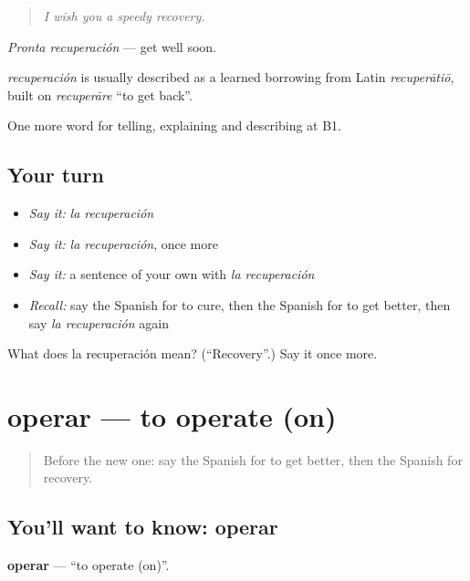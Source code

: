 \begin{quote}
\emph{I wish you a speedy recovery.}
\end{quote}

\emph{Pronta recuperación} — get well soon.

\begin{cousinweb}
\emph{recuperación} is usually described as a learned borrowing from Latin \emph{recuperātiō}, built on \emph{recuperāre} \textquotedblleft{}to get back\textquotedblright{}.
\end{cousinweb}

\begin{grammarlens}[title={What you've built}]
One more word for telling, explaining and describing at B1.
\end{grammarlens}

\subsection*{Your turn}
\begin{itemize}
\raggedright
  \item \emph{Say it:} \emph{la recuperación}
  \item \emph{Say it:} \emph{la recuperación}, once more
  \item \emph{Say it:} a sentence of your own with \emph{la recuperación}
  \item \emph{Recall:} say the Spanish for to cure, then the Spanish for to get better, then say \emph{la recuperación} again
\end{itemize}

\begin{tcolorbox}[breakable,colback=teal!4,colframe=teal!35!black,title={Before you move on}]
What does la recuperación mean? (\textquotedblleft{}Recovery\textquotedblright{}.) Say it once more.
\end{tcolorbox}
\section[operar]{operar — to operate (on)}

\label{lesson:ES-C739-operar}



\begin{quote}
Before the new one: say the Spanish for to get better, then the Spanish for recovery.
\end{quote}

\subsection*{You'll want to know: operar}
\textbf{operar} — \textquotedblleft{}to operate (on)\textquotedblright{}.

